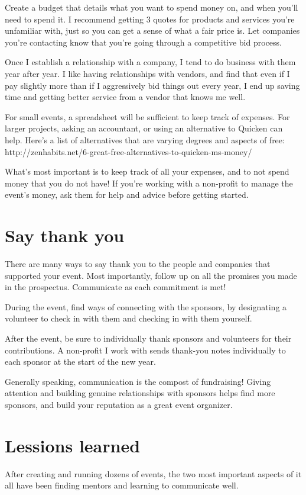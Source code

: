 Create a budget that details what you want to spend money on, and when you’ll need to spend it. I recommend getting 3 quotes for products and services you’re unfamiliar with, just so you can get a sense of what a fair price is. Let companies you’re contacting know that you’re going through a competitive bid process. 

Once I establish a relationship with a company, I tend to do business with them year after year. I like having relationships with vendors, and find that even if I pay slightly more than if I aggressively bid things out every year, I end up saving time and getting better service from a vendor that knows me well. 

For small events, a spreadsheet will be sufficient to keep track of expenses. For larger projects, asking an accountant, or using an alternative to Quicken can help. Here’s a list of alternatives that are varying degrees and aspects of free: http://zenhabits.net/6-great-free-alternatives-to-quicken-ms-money/

What’s most important is to keep track of all your expenses, and to not spend money that you do not have! If you’re working with a non-profit to manage the event’s money, ask them for help and advice before getting started.

\section*{Say thank you}
There are many ways to say thank you to the people and companies that supported your event. Most importantly, follow up on all the promises you made in the prospectus. Communicate as each commitment is met!

During the event, find ways of connecting with the sponsors, by designating a volunteer to check in with them and checking in with them yourself.

After the event, be sure to individually thank sponsors and volunteers for their contributions. A non-profit I work with sends thank-you notes individually to each sponsor at the start of the new year.

Generally speaking, communication is the compost of fundraising! Giving attention and building genuine relationships with sponsors helps find more sponsors, and build your reputation as a great event organizer.

\section*{Lessions learned}
After creating and running dozens of events, the two most important aspects of it all have been finding mentors and learning to communicate well. 

